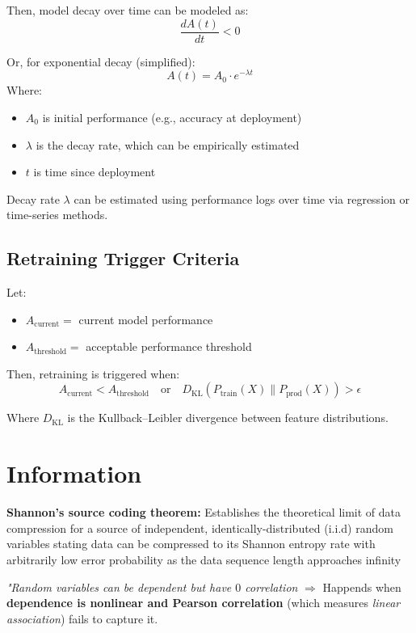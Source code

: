 \documentclass[../Main.tex]{subfiles}
\begin{document}
Then, model decay over time can be modeled as:
\[
\frac{dA(t)}{dt} < 0
\]

Or, for exponential decay (simplified):
\[
A(t) = A_0 \cdot e^{-\lambda t}
\]
Where:
\begin{itemize}
    \item $A_0$ is initial performance (e.g., accuracy at deployment)
    \item $\lambda$ is the decay rate, which can be empirically estimated
    \item $t$ is time since deployment
\end{itemize}

Decay rate $\lambda$ can be estimated using performance logs over time via regression or time-series methods.

\subsection*{Retraining Trigger Criteria}

Let:
\begin{itemize}
    \item $A_{\text{current}} =$ current model performance
    \item $A_{\text{threshold}} =$ acceptable performance threshold
\end{itemize}

Then, retraining is triggered when:
\[
A_{\text{current}} < A_{\text{threshold}} \quad \text{or} \quad D_{\text{KL}}\left(P_{\text{train}}(X) \| P_{\text{prod}}(X)\right) > \epsilon
\]

Where $D_{\text{KL}}$ is the Kullback--Leibler divergence between feature distributions.

\section{Information}

\textbf{Shannon's source coding theorem:} Establishes the theoretical limit of data compression for a source of independent, identically-distributed (i.i.d) random variables stating data can be compressed to its Shannon entropy rate with arbitrarily low error probability as the data sequence length approaches infinity 

\textit{"Random variables can be dependent but have $0$ correlation} $\Rightarrow$ Happends when \textbf{dependence is nonlinear and Pearson correlation} (which measures \textit{linear association}) fails to capture it.
\end{document}
